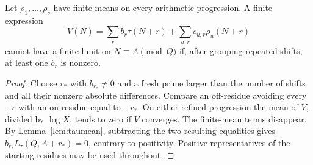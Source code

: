 \begin{lemma}\label{lem:tauseparation}
Let $\rho_1,\ldots,\rho_s$ have finite means on every arithmetic
progression. A finite expression
\[
 V(N)=\sum_r b_r\tau(N+r)+\sum_{u,r}c_{u,r}\rho_u(N+r)
\]
cannot have a finite limit on $N\equiv A\pmod Q$ if, after grouping
repeated shifts, at least one $b_r$ is nonzero.
\end{lemma}
\begin{proof}
Choose $r_*$ with $b_{r_*}\ne0$ and a fresh prime larger than the number
of shifts and all their nonzero absolute differences. Compare an off-residue
avoiding every $-r$ with an on-residue equal to $-r_*$. On either refined
progression the mean of $V$, divided by $\log X$, tends to zero if $V$
converges. The finite-mean terms disappear. By Lemma~\ref{lem:taumean},
subtracting the two resulting equalities gives
$b_{r_*}L_\tau(Q,A+r_*)=0$, contrary to positivity. Positive representatives
of the starting residues may be used throughout.
\end{proof}

